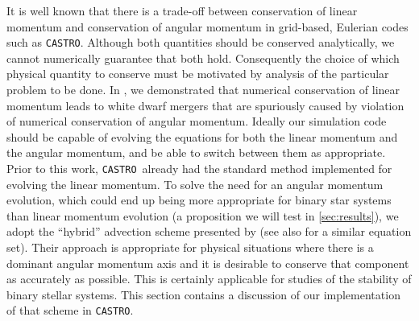 \documentclass[twocolumn,numberedappendix]{../aastex6}
\newcommand{\castro}{\texttt{CASTRO}}
\begin{document}
It is well known that there is a trade-off between conservation of linear
momentum and conservation of angular momentum in grid-based, Eulerian codes
such as \castro. Although both quantities should be conserved analytically, we cannot
numerically guarantee that both hold. Consequently the choice of which
physical quantity to conserve must be motivated by analysis of the particular
problem to be done. In \cite{wdmergerI}, we demonstrated that numerical conservation
of linear momentum leads to white dwarf mergers that are spuriously caused by violation
of numerical conservation of angular momentum. Ideally our simulation code should be capable of evolving the
equations for both the linear momentum and the angular momentum, and be
able to switch between them as appropriate. Prior to this work, \castro\
already had the standard method implemented for evolving the linear momentum.
To solve the need for an angular momentum evolution, which could end up being more
appropriate for binary star systems than linear momentum evolution (a proposition we
will test in \autoref{sec:results}), we adopt the ``hybrid''
advection scheme presented by \cite{byerly:2014} (see also \cite{motl:2002} for
a similar equation set). Their approach is appropriate for physical situations
where there is a dominant angular momentum axis and it is desirable to conserve
that component as accurately as possible. This is certainly applicable for
studies of the stability of binary stellar systems. This section contains a
discussion of our implementation of that scheme in \castro.
\end{document}
